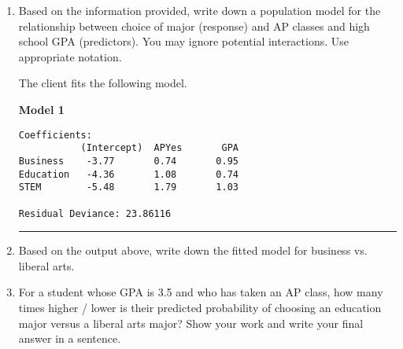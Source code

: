 \documentclass[11pt]{article}
\begin{document}
\begin{enumerate}

\item Based on the information provided, write down a population model for the relationship between choice of major (response) and AP classes and high school GPA (predictors). You may ignore potential interactions. Use appropriate notation.


\vspace{5cm} 

\pagebreak

The client fits the following model.  

\textbf{Model 1} 

\begin{verbatim}
Coefficients:
           (Intercept)  APYes       GPA 
Business    -3.77       0.74       0.95   
Education   -4.36       1.08       0.74
STEM        -5.48       1.79       1.03

Residual Deviance: 23.86116 
\end{verbatim}

\rule{\textwidth}{1pt}

\item Based on the output above, write down the fitted model for business vs. liberal arts. 


\vspace{7cm} 


\item For a student whose GPA is 3.5 and who has taken an AP class, how many times higher / lower is their predicted probability of choosing an education major versus a liberal arts major? Show your work and write your final answer in a sentence. 

\pagebreak





%
%
%
%
%
%
%
%
%
%
%
%


\end{enumerate}
\end{document}
